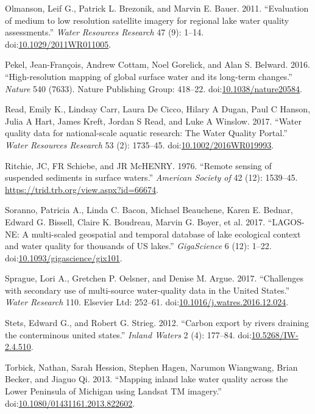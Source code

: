 \documentclass[]{article}
\begin{document}
\hypertarget{ref-Olmanson2011}{}
Olmanson, Leif G., Patrick L. Brezonik, and Marvin E. Bauer. 2011.
``Evaluation of medium to low resolution satellite imagery for regional
lake water quality assessments.'' \emph{Water Resources Research} 47
(9): 1--14.
doi:\href{https://doi.org/10.1029/2011WR011005}{10.1029/2011WR011005}.

\hypertarget{ref-Pekel2016}{}
Pekel, Jean-François, Andrew Cottam, Noel Gorelick, and Alan S. Belward.
2016. ``High-resolution mapping of global surface water and its
long-term changes.'' \emph{Nature} 540 (7633). Nature Publishing Group:
418--22.
doi:\href{https://doi.org/10.1038/nature20584}{10.1038/nature20584}.

\hypertarget{ref-Read2017}{}
Read, Emily K., Lindsay Carr, Laura De Cicco, Hilary A Dugan, Paul C
Hanson, Julia A Hart, James Kreft, Jordan S Read, and Luke A Winslow.
2017. ``Water quality data for national-scale aquatic research: The
Water Quality Portal.'' \emph{Water Resources Research} 53 (2):
1735--45.
doi:\href{https://doi.org/10.1002/2016WR019993}{10.1002/2016WR019993}.

\hypertarget{ref-Ritchie1976}{}
Ritchie, JC, FR Schiebe, and JR McHENRY. 1976. ``Remote sensing of
suspended sediments in surface waters.'' \emph{American Society of} 42
(12): 1539--45. \url{https://trid.trb.org/view.aspx?id=66674}.

\hypertarget{ref-Soranno2017}{}
Soranno, Patricia A., Linda C. Bacon, Michael Beauchene, Karen E.
Bednar, Edward G. Bissell, Claire K. Boudreau, Marvin G. Boyer, et al.
2017. ``LAGOS-NE: A multi-scaled geospatial and temporal database of
lake ecological context and water quality for thousands of US lakes.''
\emph{GigaScience} 6 (12): 1--22.
doi:\href{https://doi.org/10.1093/gigascience/gix101}{10.1093/gigascience/gix101}.

\hypertarget{ref-Sprague2017}{}
Sprague, Lori A., Gretchen P. Oelsner, and Denise M. Argue. 2017.
``Challenges with secondary use of multi-source water-quality data in
the United States.'' \emph{Water Research} 110. Elsevier Ltd: 252--61.
doi:\href{https://doi.org/10.1016/j.watres.2016.12.024}{10.1016/j.watres.2016.12.024}.

\hypertarget{ref-Stets2012}{}
Stets, Edward G., and Robert G. Strieg. 2012. ``Carbon export by rivers
draining the conterminous united states.'' \emph{Inland Waters} 2 (4):
177--84.
doi:\href{https://doi.org/10.5268/IW-2.4.510}{10.5268/IW-2.4.510}.

\hypertarget{ref-Torbick2013}{}
Torbick, Nathan, Sarah Hession, Stephen Hagen, Narumon Wiangwang, Brian
Becker, and Jiaguo Qi. 2013. ``Mapping inland lake water quality across
the Lower Peninsula of Michigan using Landsat TM imagery.''
doi:\href{https://doi.org/10.1080/01431161.2013.822602}{10.1080/01431161.2013.822602}.
\end{document}
